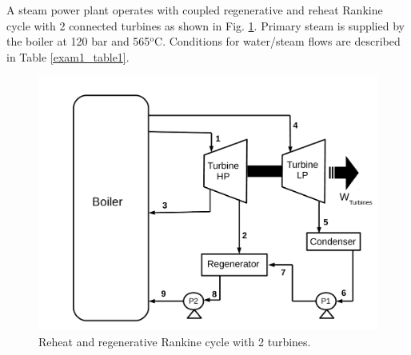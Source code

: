 \documentclass[calculator,steamtables,refrigeranttables,psychrometricchart,datasheet,solutions]{exam}
\begin{document}
\begin{question} %
A steam power plant operates with coupled regenerative and reheat Rankine cycle with 2 connected turbines as shown in Fig. \ref{exam_mod02_rankinecycle}.  Primary steam is supplied by the boiler at 120 bar and 565$^{\text{o}}$C. Conditions for water/steam flows are described in Table \ref{exam1_table1}. 

\begin{figure}[h]
\begin{center}
\includegraphics[width=8.cm,clip]{./Pics/Exam_Reheat_Regenerative_Rankine_Cycle}
\caption{ Reheat and regenerative Rankine cycle with 2 turbines.}
\label{exam_mod02_rankinecycle}
\end{center}
\end{figure}


\end{question}
\end{document}

